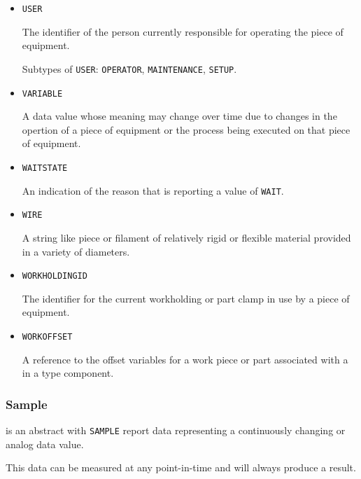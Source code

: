 \begin{itemize}
\item \texttt{USER}  

The identifier of the person currently responsible for operating the piece of equipment.

Subtypes of \texttt{USER}: \texttt{OPERATOR}, \texttt{MAINTENANCE}, \texttt{SET\textunderscore UP}.

\item \texttt{VARIABLE}  

A data value whose meaning may change over time due to changes in the opertion of a piece of equipment or the process being executed on that piece of equipment.


\item \texttt{WAIT\textunderscore STATE}  

An indication of the reason that  is reporting a value of \texttt{WAIT}.


\item \texttt{WIRE}  

A string like piece or filament of relatively rigid or flexible material provided in a variety of diameters.


\item \texttt{WORKHOLDING\textunderscore ID}  

The identifier for the current workholding or part clamp in use by a piece of equipment.


\item \texttt{WORK\textunderscore OFFSET}  

A reference to the offset variables for a work piece or part associated with a  in a  type component.

\end{itemize}



\subsubsection{Sample}
\label{sec:Sample}



 is an abstract  with \texttt{SAMPLE}  report data representing a continuously changing or analog data value.

This data can be measured at any point-in-time and will always produce a result.



